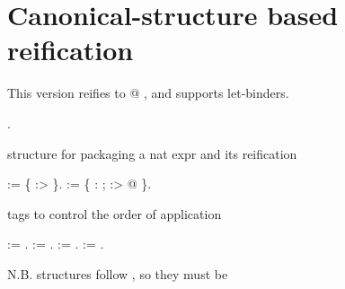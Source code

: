 \begin{coqdoccode}
\end{coqdoccode}
\section{Canonical-structure based reification}

 This version reifies to @ , and supports let-binders. \begin{coqdoccode}
\coqdocemptyline
\coqdocnoindent
{}  .\coqdoceol
\coqdocemptyline
\end{coqdoccode}
structure for packaging a nat expr and its reification \begin{coqdoccode}
\coqdocemptyline
\coqdocnoindent
{}  :=  \{  :>  \}.\coqdoceol
\coqdocnoindent
{}  :=\coqdoceol
\coqdocindent{1.00em}
 \{  :  ;  :> @  \}.\coqdoceol
\coqdocemptyline
\end{coqdoccode}
tags to control the order of application \begin{coqdoccode}
\coqdocemptyline
\coqdocnoindent
{}  := .\coqdoceol
\coqdocnoindent
{}  := .\coqdoceol
\coqdocnoindent
{}  := .\coqdoceol
\coqdocnoindent
{}  := .\coqdoceol
\coqdocemptyline
\end{coqdoccode}
N.B.  structures follow , so they must be
